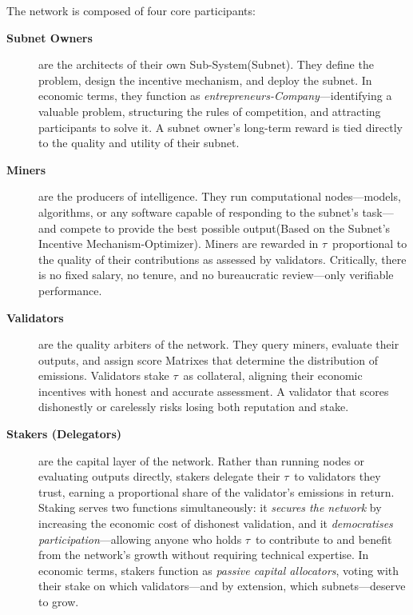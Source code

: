 \documentclass[12pt, a4paper, oneside]{report}
\newcommand{\TAO}{$\tau$}            %
\theoremstyle{definition}
\begin{document}
The network is composed of four core participants:

\begin{description}
  \item[\textbf{Subnet Owners}] are the architects of their own Sub-System(Subnet). They define the 
  problem, design the incentive mechanism, and deploy the subnet. In economic terms, 
  they function as \emph{entrepreneurs-Company}—identifying a valuable problem, structuring 
  the rules of competition, and attracting participants to solve it. A subnet owner's 
  long-term reward is tied directly to the quality and utility of their subnet.

  \item[\textbf{Miners}] are the producers of intelligence. They run computational 
  nodes—models, algorithms, or any software capable of responding to the subnet's 
  task—and compete to provide the best possible output(Based on the Subnet's Incentive Mechanism-Optimizer). Miners are rewarded in \TAO\ 
  proportional to the quality of their contributions as assessed by validators. 
  Critically, there is no fixed salary, no tenure, and no bureaucratic review—only 
  verifiable performance.

  \item[\textbf{Validators}] are the quality arbiters of the network. They query 
  miners, evaluate their outputs, and assign score Matrixes that determine the distribution 
  of emissions. Validators stake \TAO\ as collateral, aligning their economic 
  incentives with honest and accurate assessment. A validator that scores dishonestly 
  or carelessly risks losing both reputation and stake.

  \item[\textbf{Stakers (Delegators)}] are the capital layer of the network. Rather 
  than running nodes or evaluating outputs directly, stakers delegate their \TAO\ to 
  validators they trust, earning a proportional share of the validator's emissions in 
  return. Staking serves two functions simultaneously: it \emph{secures the network} 
  by increasing the economic cost of dishonest validation, and it \emph{democratises 
  participation}—allowing anyone who holds \TAO\ to contribute to and benefit from 
  the network's growth without requiring technical expertise. In economic terms, 
  stakers function as \emph{passive capital allocators}, voting with their stake on 
  which validators—and by extension, which subnets—deserve to grow.

  
\end{description}
\end{document}
